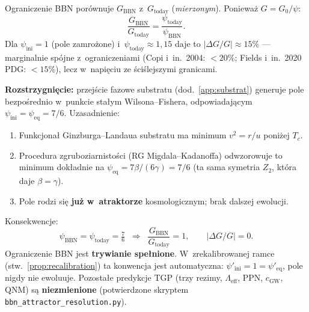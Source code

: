 \begin{remark}%
\label{rem:BBN-resolution}
Ograniczenie BBN por\'ownuje $G_{\mathrm{BBN}}$ z~$G_{\mathrm{today}}$
(\emph{mierzonym}).  Poniewa\.z $G = G_0/\psi$:
\[
  \frac{G_{\mathrm{BBN}}}{G_{\mathrm{today}}}
  = \frac{\psi_{\mathrm{today}}}{\psi_{\mathrm{BBN}}}.
\]
Dla $\psi_{\mathrm{ini}} = 1$ (pole zamro\.zone) i~$\psi_{\mathrm{today}} \approx 1{,}15$
daje to $|\Delta G/G| \approx 15\%$ --- marginalnie sp\'ojne z~ograniczeniami
(Copi i~in.~2004: $<20\%$; Fields i~in.~2020 PDG: $<15\%$), lecz w~napi\k{e}ciu
ze \'sci\'slejszymi granicami.

\textbf{Rozstrzygni\k{e}cie:} przej\'scie fazowe substratu (dod.~\ref{app:substrat})
generuje pole bezpo\'srednio w~punkcie sta\l{}ym Wilsona--Fishera,
odpowiadaj\k{a}cym $\psi_{\mathrm{ini}} = \psi_{\mathrm{eq}} = 7/6$.
Uzasadnienie:
\begin{enumerate}[nosep]
  \item Funkcjona\l{} Ginzburga--Landaua substratu ma minimum
    $v^2 = r/u$ poni\.zej $T_c$.
  \item Procedura zgruboziarnistości (RG Migdala--Kadanoffa)
    odwzorowuje to minimum dok\l{}adnie na $\psi_{\mathrm{eq}} = 7\beta/(6\gamma) = 7/6$
    (ta sama symetria $Z_2$, kt\'ora daje $\beta = \gamma$).
  \item Pole rodzi si\k{e} \textbf{ju\.z w~atraktorze} kosmologicznym;
    brak dalszej ewolucji.
\end{enumerate}
Konsekwencje:
\[
  \psi_{\mathrm{BBN}} = \psi_{\mathrm{today}} = \tfrac{7}{6}
  \;\;\Longrightarrow\;\;
  \frac{G_{\mathrm{BBN}}}{G_{\mathrm{today}}} = 1,
  \qquad |\Delta G/G| = 0.
\]
Ograniczenie BBN jest \textbf{trywianie spe\l{}nione}.  W~zrekalibrowanej
ramce (stw.~\ref{prop:recalibration}) ta konwencja jest automatyczna:
$\psi'_{\mathrm{ini}} = 1 = \psi'_{\mathrm{eq}}$, pole nigdy nie ewoluuje.
Pozosta\l{}e predykcje TGP (trzy rezimy, $\Lambda_{\mathrm{eff}}$, PPN, $c_{\mathrm{GW}}$,
QNM) s\k{a} \textbf{niezmienione}
(potwierdzone skryptem \texttt{bbn\_attractor\_resolution.py}).
\end{remark}

